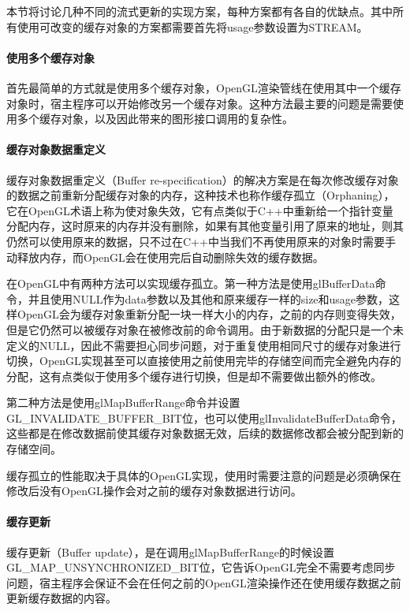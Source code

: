 本节将讨论几种不同的流式更新的实现方案，每种方案都有各自的优缺点。其中所有使用可改变的缓存对象的方案都需要首先将usage参数设置为STREAM。


\paragraph{使用多个缓存对象}
首先最简单的方式就是使用多个缓存对象，OpenGL渲染管线在使用其中一个缓存对象时，宿主程序可以开始修改另一个缓存对象。这种方法最主要的问题是需要使用多个缓存对象，以及因此带来的图形接口调用的复杂性。



\paragraph{缓存对象数据重定义}
缓存对象数据重定义（Buffer re-specification）的解决方案是在每次修改缓存对象的数据之前重新分配缓存对象的内存，这种技术也称作缓存孤立（Orphaning），它在OpenGL术语上称为使对象失效，它有点类似于C++中重新给一个指针变量分配内存，这时原来的内存并没有删除，如果有其他变量引用了原来的地址，则其仍然可以使用原来的数据，只不过在C++中当我们不再使用原来的对象时需要手动释放内存，而OpenGL会在使用完后自动删除失效的缓存数据。

在OpenGL中有两种方法可以实现缓存孤立。第一种方法是使用glBufferData命令，并且使用NULL作为data参数以及其他和原来缓存一样的size和usage参数，这样OpenGL会为缓存对象重新分配一块一样大小的内存，之前的内存则变得失效，但是它仍然可以被缓存对象在被修改前的命令调用。由于新数据的分配只是一个未定义的NULL，因此不需要担心同步问题，对于重复使用相同尺寸的缓存对象进行切换，OpenGL实现甚至可以直接使用之前使用完毕的存储空间而完全避免内存的分配，这有点类似于使用多个缓存进行切换，但是却不需要做出额外的修改。

第二种方法是使用glMapBufferRange命令并设置GL\_INVALIDATE\_BUFFER\_BIT位，也可以使用glInvalidateBufferData​命令，这些都是在修改数据前使其缓存对象数据无效，后续的数据修改都会被分配到新的存储空间。

缓存孤立的性能取决于具体的OpenGL实现，使用时需要注意的问题是必须确保在修改后没有OpenGL操作会对之前的缓存对象数据进行访问。




\paragraph{缓存更新}
缓存更新（Buffer update），是在调用glMapBufferRange的时候设置GL\_MAP\_UNSYNCHRONIZED\_BIT位，它告诉OpenGL完全不需要考虑同步问题，宿主程序会保证不会在任何之前的OpenGL渲染操作还在使用缓存数据之前更新缓存数据的内容。

